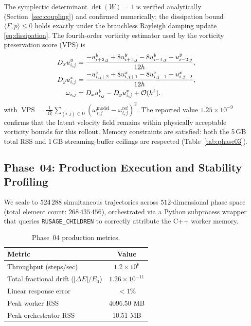 \documentclass[10pt,twocolumn]{article}
\DeclareMathOperator{\VPS}{VPS}
\begin{document}
The symplectic determinant $\det(W)=1$ is verified analytically
(Section~\ref{sec:coupling}) and confirmed numerically;
the dissipation bound $\langle F, p\rangle \le 0$ holds exactly under the
branchless Rayleigh damping update \eqref{eq:dissipation}.
The fourth-order vorticity estimator used by the vorticity preservation
score (VPS) is
\begin{align}
  D_x u^y_{i,j}
    &= \frac{-u_{i+2,j}^y + 8u_{i+1,j}^y
      -8u_{i-1,j}^y + u_{i-2,j}^y}{12h}, \notag\\
  D_y u^x_{i,j}
    &= \frac{-u_{i,j+2}^x + 8u_{i,j+1}^x
      -8u_{i,j-1}^x + u_{i,j-2}^x}{12h}, \notag\\
  \omega_{i,j} &= D_x u^y_{i,j} - D_y u^x_{i,j}
      + \mathcal{O}(h^4).
  \label{eq:vps}
\end{align}
with $\VPS=\frac{1}{|\Omega|}\sum_{(i,j)\in\Omega}
(\omega_{i,j}^{\mathrm{model}}-\omega_{i,j}^{\mathrm{ref}})^2$.
The reported value $1.25\times10^{-9}$ confirms that the latent velocity
field remains within physically acceptable vorticity bounds for this rollout.
Memory constraints are satisfied: both the 5\,GB total RSS
and 1\,GB streaming-buffer ceilings are respected
(Table~\ref{tab:phase03}).

\subsection{Phase~04: Production Execution and Stability Profiling}

We scale to $524\,288$ simultaneous trajectories across
$512$-dimensional phase space
(total element count: $268\,435\,456$),
orchestrated via a Python subprocess wrapper that queries
\texttt{RUSAGE\_CHILDREN} to correctly attribute the C++ worker memory.

\begin{table}[h]
\centering
\caption{Phase~04 production metrics.}
\label{tab:prod}
\small
\begin{tabular}{@{}lc@{}}
\toprule
\textbf{Metric} & \textbf{Value} \\
\midrule
Throughput (steps/sec)         & $1.2\times10^6$ \\
Total fractional drift ($|\Delta E|/E_0$) & $1.26\times10^{-11}$ \\
Linear response error          & $<1\%$ \\
Peak worker RSS                & 4096.50 MB \\
Peak orchestrator RSS          & 10.51 MB \\
\bottomrule
\end{tabular}
\end{table}
\end{document}
